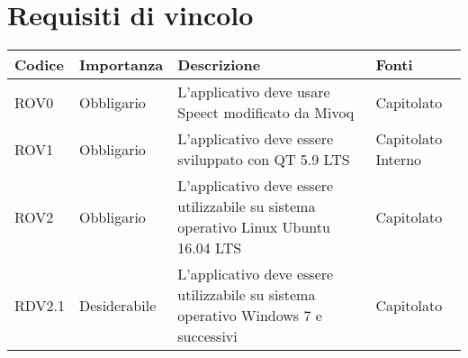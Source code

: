 \documentclass[../AnalisideiRequisiti.tex]{subfiles}
\begin{document}
	\section{Requisiti di vincolo}
			\begin{longtable}{| p{2cm} | p{2.5cm} |p{5cm} | p{2.5cm} |}
			\hline
			\textbf{Codice} & \textbf{Importanza} & \textbf{Descrizione} & \textbf{Fonti}\\
			\hline
			\endhead
				\newline ROV0&\newline Obbligario&
			\newline 
			L'applicativo deve usare Speect modificato da Mivoq &
			\newline Capitolato
			\\[1em]
			\hline	
			\newline 
			ROV1&\newline Obbligario&
			\newline 
			L'applicativo deve essere sviluppato con QT 5.9 LTS &
			\newline Capitolato
			\newline Interno
			\\[1em]
			\hline
			\newline 
			ROV2&\newline Obbligario&
			\newline 
			L'applicativo deve essere utilizzabile su sistema operativo Linux Ubuntu 16.04 LTS&
			\newline Capitolato
			\\[1em]
			\hline
			\newline
			RDV2.1&\newline Desiderabile&
			\newline 
			L'applicativo deve essere utilizzabile su sistema operativo Windows 7 e successivi&
			\newline Capitolato
			\\[1em]
			\hline
	\end{longtable}
\newpage
\end{document}
